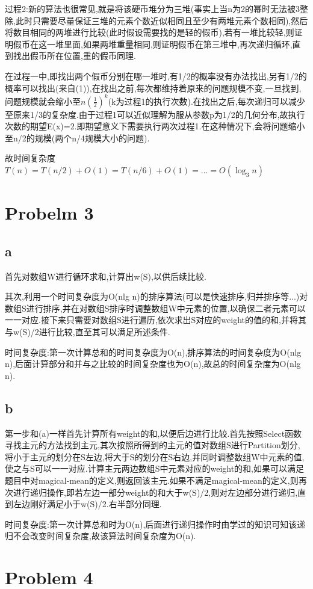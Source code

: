\documentclass[12pt,a4paper,fontset=none]{ctexart}
\begin{document}
过程2:新的算法也很常见,就是将该硬币堆分为三堆(事实上当n为2的幂时无法被3整除,此时只需要尽量保证三堆的元素个数近似相同且至少有两堆元素个数相同),然后将数目相同的两堆进行比较(此时假设需要找的是轻的假币),若有一堆比较轻,则证明假币在这一堆里面,如果两堆重量相同,则证明假币在第三堆中,再次递归循环,直到找出假币所在位置,重的假币同理.

在过程一中,即找出两个假币分别在哪一堆时,有1/2的概率没有办法找出,另有1/2的概率可以找出(来自(1)),在找出之前,每次都维持着原来的问题规模不变,一旦找到,问题规模就会缩小至$n(\frac{1}{2})^k $(k为过程1的执行次数).在找出之后,每次递归可以减少至原来1/3的复杂度.由于过程1可以近似理解为服从参数p为1/2的几何分布,故执行次数的期望E(x)=2.即期望意义下需要执行两次过程1.在这种情况下,会将问题缩小至n/2的规模(两个n/4规模大小的问题).

故时间复杂度$T(n)=T(n/2)+O(1)=T(n/6)+O(1)=...=O(\log_3 n)$
\section*{Probelm 3}
\subsection*{a}
首先对数组W进行循环求和,计算出w(S),以供后续比较.

其次,利用一个时间复杂度为O(nlg n)的排序算法(可以是快速排序,归并排序等...)对数组S进行排序,并在对数组S排序时调整数组W中元素的位置,以确保二者元素可以一一对应.接下来只需要对数组S进行遍历,依次求出S对应的weight的值的和,并将其与w(S)/2进行比较,直至其可以满足所述条件.

时间复杂度:第一次计算总和的时间复杂度为O(n),排序算法的时间复杂度为O(nlg n),后面计算部分和并与之比较的时间复杂度也为O(n),故总的时间复杂度为O(nlg n).
\subsection*{b}
第一步和(a)一样首先计算所有weight的和,以便后边进行比较.首先按照Select函数寻找主元的方法找到主元,其次按照所得到的主元的值对数组S进行Partition划分,将小于主元的划分在S左边,将大于S的划分在S右边,并同时调整数组W中元素的值,使之与S可以一一对应.计算主元两边数组S中元素对应的weight的和,如果可以满足题目中对magical-mean的定义,则返回该主元.如果不满足magical-mean的定义,则再次进行递归操作,即若左边一部分weight的和大于w(S)/2,则对左边部分进行递归,直到左边刚好满足小于w(S)/2.右半部分同理.

时间复杂度:第一次计算总和时为O(n),后面进行递归操作时由学过的知识可知该递归不会改变时间复杂度,故该算法时间复杂度为O(n).
\section*{Problem 4}
\end{document}
